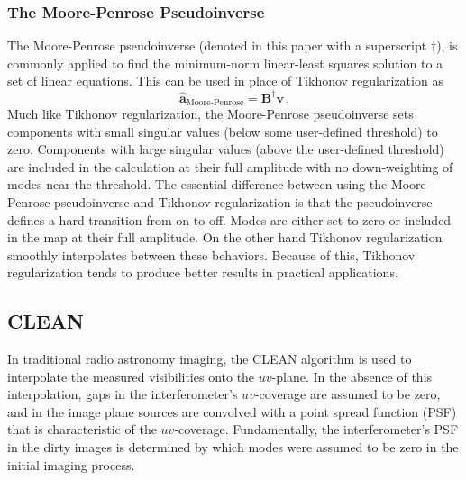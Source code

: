 \documentclass[twocolumn]{aastex61}
\renewcommand{\b}{\pmb}
\begin{document}
\subsubsection{The Moore-Penrose Pseudoinverse}

The Moore-Penrose pseudoinverse (denoted in this paper with a superscript $\dagger$), is commonly
applied to find the minimum-norm linear-least squares solution to a set of linear equations. This
can be used in place of Tikhonov regularization as
\begin{equation}
    \b{\hat a}_\text{Moore-Penrose} = \b B^\dagger\b v\,.
\end{equation}
Much like Tikhonov regularization, the Moore-Penrose pseudoinverse sets components with small
singular values (below some user-defined threshold) to zero. Components with large singular values
(above the user-defined threshold) are included in the calculation at their full amplitude with no
down-weighting of modes near the threshold. The essential difference between using the Moore-Penrose
pseudoinverse and Tikhonov regularization is that the pseudoinverse defines a hard transition from
on to off. Modes are either set to zero or included in the map at their full amplitude. On the other
hand Tikhonov regularization smoothly interpolates between these behaviors. Because of this,
Tikhonov regularization tends to produce better results in practical applications.

\subsection{CLEAN}

In traditional radio astronomy imaging, the CLEAN algorithm \citep{1974A&AS...15..417H} is used to
interpolate the measured visibilities onto the $uv$-plane. In the absence of this interpolation,
gaps in the interferometer's $uv$-coverage are assumed to be zero, and in the image plane sources
are convolved with a point spread function (PSF) that is characteristic of the $uv$-coverage.
Fundamentally, the interferometer's PSF in the dirty images is determined by which modes were
assumed to be zero in the initial imaging process.
\end{document}
